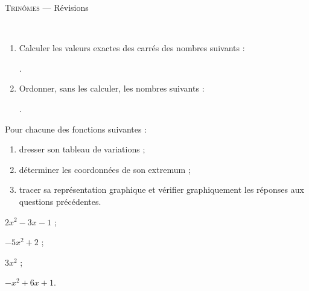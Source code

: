 \documentclass[11pt]{article}
\begin{document}
\begin{center}
  \textsc{Trinômes} --- Révisions
\end{center}

\begin{exercice}~
  \begin{enumerate}
    \item Calculer les valeurs exactes des carrés des nombres suivants :

      .
    \item Ordonner, sans les calculer, les nombres suivants :
      .
  \end{enumerate}
\end{exercice}

\begin{exercice}
  Pour chacune des fonctions suivantes :
  \begin{enumerate}
    \item dresser son tableau de variations ;
    \item déterminer les coordonnées de son extremum ;
    \item tracer sa représentation graphique et vérifier graphiquement les réponses aux questions précédentes.
  \end{enumerate}
  \begin{inparaenum}[(a)]
  \item $2x^2-3x-1$ ;
  \item $-5x^2+2$ ;
  \item $3x^2$ ;
  \item $-x^2+6x+1$.
  \end{inparaenum}
\end{exercice}
\end{document}
